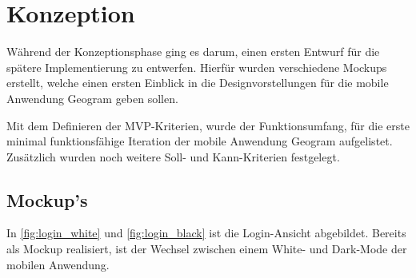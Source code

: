 \chapter{Konzeption\label{chap2:Zweites-Kapitel}}

Während der Konzeptionsphase ging es darum, einen ersten Entwurf für die spätere Implementierung zu entwerfen. Hierfür wurden verschiedene Mockups erstellt, welche einen ersten Einblick in die Designvorstellungen für die mobile Anwendung \glqq Geogram\grqq{} geben sollen.

Mit dem Definieren der MVP-Kriterien, wurde der Funktionsumfang, für die erste minimal funktionsfähige Iteration der mobile Anwendung \glqq Geogram\grqq{} aufgelistet. Zusätzlich wurden noch weitere Soll- und Kann-Kriterien festgelegt.

\section{Mockup's\label{sec2.1:Unterpunkt-1}}

In \autoref{fig:login_white} und \autoref{fig:login_black} ist die Login-Ansicht abgebildet. Bereits als Mockup realisiert, ist der Wechsel zwischen einem White- und Dark-Mode der mobilen Anwendung.

